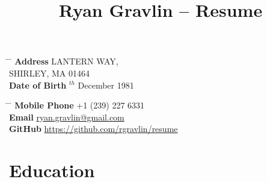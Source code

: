 \documentclass[10pt]{article} %
\begin{document}
\title{Ryan Gravlin -- Resume} %
\parbox{0.5\textwidth}{ %
\begin{tabbing} %
\hspace{3cm} \= \hspace{4cm} \= \kill %
{\bf Address}  LANTERN WAY,\\ %
\> SHIRLEY, MA 01464 \\ %
{\bf Date of Birth} $^{th}$ December 1981 \\ %
\end{tabbing}}
\hfill %
\parbox{0.5\textwidth}{ %
\begin{tabbing} %
\hspace{3cm} \= \hspace{4cm} \= \kill %
{\bf Mobile Phone} \> +1 (239) 227 6331 \\ %
{\bf Email} \> \href{mailto:ryan.gravlin@gmail.com}{ryan.gravlin@gmail.com} \\ %
{\bf GitHub} \> \href{https://github.com/rgravlin/resume}{https://github.com/rgravlin/resume} \\ %
\end{tabbing}}

\section{Education}


\end{document}
